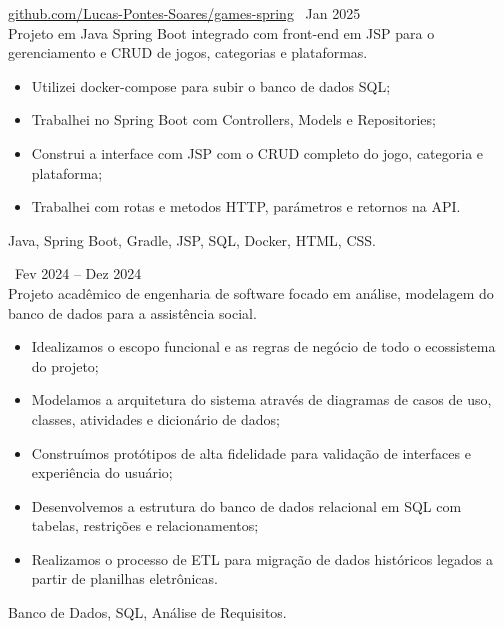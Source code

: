  \textbar{}  \href{https://github.com/Lucas-Pontes-Soares/games-spring}{github.com/Lucas-Pontes-Soares/games-spring} \hfill\ Jan 2025 \\
Projeto em Java Spring Boot integrado com front-end em JSP para o gerenciamento e CRUD de jogos, categorias e plataformas.
\begin{itemize}
    \item Utilizei docker-compose para subir o banco de dados SQL;
    \item Trabalhei no Spring Boot com Controllers, Models e Repositories;
    \item Construi a interface com JSP com o CRUD completo do jogo, categoria e plataforma;
    \item Trabalhei com rotas e metodos HTTP, parámetros e retornos na API.
\end{itemize}
 Java, Spring Boot, Gradle, JSP, SQL, Docker, HTML, CSS.

        
 \hfill\ Fev 2024 -- Dez 2024 \\
Projeto acadêmico de engenharia de software focado em análise, modelagem do banco de dados para a assistência social.
\begin{itemize}
    \item Idealizamos o escopo funcional e as regras de negócio de todo o ecossistema do projeto;
    \item Modelamos a arquitetura do sistema através de diagramas de casos de uso, classes, atividades e dicionário de dados;
    \item Construímos protótipos de alta fidelidade para validação de interfaces e experiência do usuário;
    \item Desenvolvemos a estrutura do banco de dados relacional em SQL com tabelas, restrições e relacionamentos;
    \item Realizamos o processo de ETL para migração de dados históricos legados a partir de planilhas eletrônicas.
\end{itemize}
 Banco de Dados, SQL, Análise de Requisitos.

        
